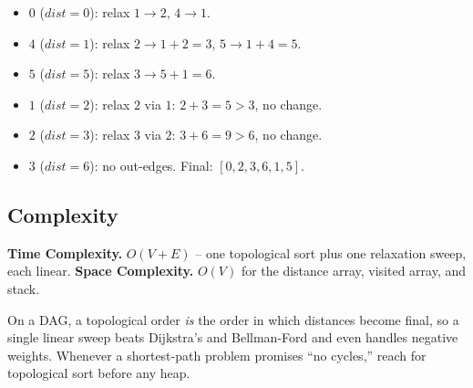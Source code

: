 
\begin{itemize}
  \item $0$ ($\textit{dist}=0$): relax $1\to2$, $4\to1$.
  \item $4$ ($\textit{dist}=1$): relax $2\to1+2=3$, $5\to1+4=5$.
  \item $5$ ($\textit{dist}=5$): relax $3\to5+1=6$.
  \item $1$ ($\textit{dist}=2$): relax $2$ via $1$: $2+3=5>3$, no
        change.
  \item $2$ ($\textit{dist}=3$): relax $3$ via $2$: $3+6=9>6$, no
        change.
  \item $3$ ($\textit{dist}=6$): no out-edges. Final:
        $[0,2,3,6,1,5]$.
\end{itemize}

\subsection*{Complexity}

\begin{complexitybox}
\textbf{Time Complexity.} $O(V+E)$ -- one topological sort plus one
relaxation sweep, each linear. \textbf{Space Complexity.} $O(V)$ for
the distance array, visited array, and stack.
\end{complexitybox}

\begin{takeawaybox}
On a DAG, a topological order \emph{is} the order in which distances
become final, so a single linear sweep beats Dijkstra's and Bellman-Ford
and even handles negative weights. Whenever a shortest-path problem
promises ``no cycles,'' reach for topological sort before any heap.
\end{takeawaybox}
